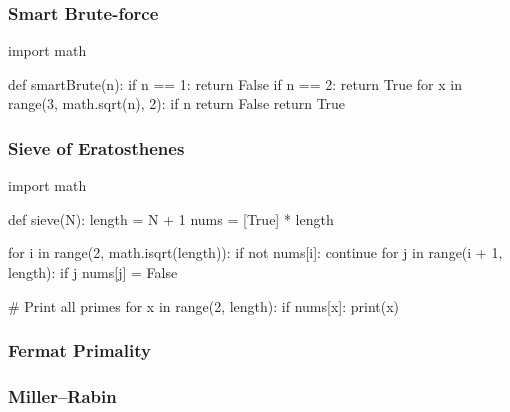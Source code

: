 \documentclass[main.tex]{subfiles}
\begin{document}
\subsubsection{Smart Brute-force}

\begin{python}
    import math

    def smartBrute(n):
        if n == 1:
            return False
        if n == 2:
            return True
        for x in range(3, math.sqrt(n), 2):
            if n %
                return False
        return True
\end{python}

\subsubsection{Sieve of Eratosthenes}

\begin{python}
    import math

    def sieve(N):
        length = N + 1
        nums = [True] * length

        for i in range(2, math.isqrt(length)):
            if not nums[i]:
                continue
            for j in range(i + 1, length):
                if j %
                    nums[j] = False

        # Print all primes
        for x in range(2, length):
            if nums[x]:
                print(x)
\end{python}

\subsubsection{Fermat Primality}

\subsubsection{Miller–Rabin}
\end{document}
